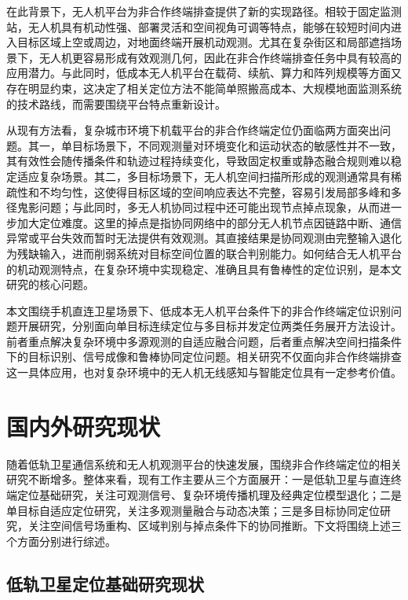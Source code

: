 在此背景下，无人机平台为非合作终端排查提供了新的实现路径。相较于固定监测站，无人机具有机动性强、部署灵活和空间视角可调等特点，能够在较短时间内进入目标区域上空或周边，对地面终端开展机动观测。尤其在复杂街区和局部遮挡场景下，无人机更容易形成有效观测几何，因此在非合作终端排查任务中具有较高的应用潜力\cite{AlHourani2014A2GPathLoss,Chen2017UAVRadioMap,Li2022UAVRadioMapSemantics,SpectrumSurveying2022}。与此同时，低成本无人机平台在载荷、续航、算力和阵列规模等方面又存在明显约束，这决定了相关定位方法不能简单照搬高成本、大规模地面监测系统的技术路线，而需要围绕平台特点重新设计\cite{Wymeersch2009CooperativeLocalization}。

从现有方法看，复杂城市环境下机载平台的非合作终端定位仍面临两方面突出问题。其一，单目标场景下，不同观测量对环境变化和运动状态的敏感性并不一致，其有效性会随传播条件和轨迹过程持续变化，导致固定权重或静态融合规则难以稳定适应复杂场景。其二，多目标场景下，无人机空间扫描所形成的观测通常具有稀疏性和不均匀性，这使得目标区域的空间响应表达不完整，容易引发局部多峰和多径鬼影问题；与此同时，多无人机协同过程中还可能出现节点掉点现象，从而进一步加大定位难度\cite{RadioUNet2021,Romero2022SpectrumCartography}。这里的掉点是指协同网络中的部分无人机节点因链路中断、通信异常或平台失效而暂时无法提供有效观测。其直接结果是协同观测由完整输入退化为残缺输入，进而削弱系统对目标空间位置的联合判别能力。如何结合无人机平台的机动观测特点，在复杂环境中实现稳定、准确且具有鲁棒性的定位识别，是本文研究的核心问题。

本文围绕手机直连卫星场景下、低成本无人机平台条件下的非合作终端定位识别问题开展研究，分别面向单目标连续定位与多目标并发定位两类任务展开方法设计。前者重点解决复杂环境中多源观测的自适应融合问题，后者重点解决空间扫描条件下的目标识别、信号成像和鲁棒协同定位问题。相关研究不仅面向非合作终端排查这一具体应用，也对复杂环境中的无人机无线感知与智能定位具有一定参考价值。

\section{国内外研究现状}
\label{sec:1_2}

随着低轨卫星通信系统和无人机观测平台的快速发展，围绕非合作终端定位的相关研究不断增多。整体来看，现有工作主要从三个方面展开：一是低轨卫星与直连终端定位基础研究，关注可观测信号、复杂环境传播机理及经典定位模型退化；二是单目标自适应定位研究，关注多观测量融合与动态决策；三是多目标协同定位研究，关注空间信号场重构、区域判别与掉点条件下的协同推断。下文将围绕上述三个方面分别进行综述。

\subsection{低轨卫星定位基础研究现状}
\label{subsec:1_2_1}

